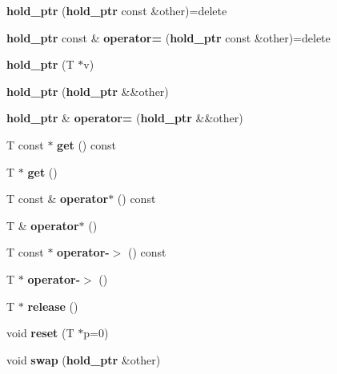 \begin{DoxyCompactItemize}
\item 
{\bfseries hold\+\_\+ptr} ({\bf hold\+\_\+ptr} const \&other)=delete\label{classbooster_1_1hold__ptr_ab21b73bd283f25d3ca5f05c59c81d9ae}

\item 
{\bf hold\+\_\+ptr} const \& {\bfseries operator=} ({\bf hold\+\_\+ptr} const \&other)=delete\label{classbooster_1_1hold__ptr_ab5f2765f218ab23eb7cfb4d2457bdf7d}

\item 
{\bfseries hold\+\_\+ptr} (T $\ast$v)\label{classbooster_1_1hold__ptr_a223d2975afbe9ee36d7bcb46b0660c69}

\item 
{\bfseries hold\+\_\+ptr} ({\bf hold\+\_\+ptr} \&\&other)\label{classbooster_1_1hold__ptr_a79a9432c1f33ae546ac73487fb40f257}

\item 
{\bf hold\+\_\+ptr} \& {\bfseries operator=} ({\bf hold\+\_\+ptr} \&\&other)\label{classbooster_1_1hold__ptr_a445d8a65e00e84183612e7af60f33fd8}

\item 
T const $\ast$ {\bfseries get} () const \label{classbooster_1_1hold__ptr_ae2a5b54ceae122b72137db9b81b1b2dc}

\item 
T $\ast$ {\bfseries get} ()\label{classbooster_1_1hold__ptr_a0f0082a308f41a3fbb338afdeb38a519}

\item 
T const \& {\bfseries operator$\ast$} () const \label{classbooster_1_1hold__ptr_aef20cf4835ebf609a207a8156577eb16}

\item 
T \& {\bfseries operator$\ast$} ()\label{classbooster_1_1hold__ptr_ae97eba0c251bca2d7c97cfef0227a239}

\item 
T const $\ast$ {\bfseries operator-\/$>$} () const \label{classbooster_1_1hold__ptr_af568396317ee56a949185191f482795f}

\item 
T $\ast$ {\bfseries operator-\/$>$} ()\label{classbooster_1_1hold__ptr_a16e6bf7b9f8c5291a6d7883da66bcfba}

\item 
T $\ast$ {\bfseries release} ()\label{classbooster_1_1hold__ptr_ab090193fe1ad4bdb440ad6823d1df442}

\item 
void {\bfseries reset} (T $\ast$p=0)\label{classbooster_1_1hold__ptr_a55dfbb766f1a142244ed3fa487e8c173}

\item 
void {\bfseries swap} ({\bf hold\+\_\+ptr} \&other)\label{classbooster_1_1hold__ptr_a06ab24950be2e9b632aaf84ffc7145e8}

\end{DoxyCompactItemize}


